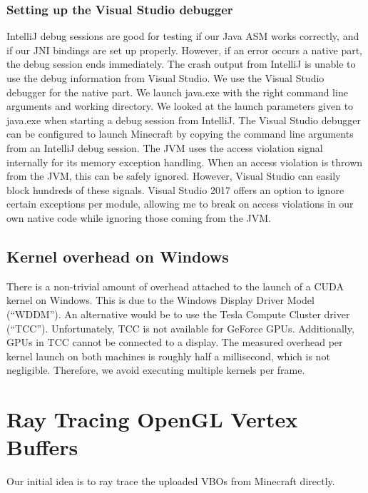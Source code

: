 \documentclass[]{article}
\begin{document}
\subsubsection{Setting up the Visual Studio debugger}
IntelliJ debug sessions are good for testing if our Java ASM works correctly, and if our JNI bindings are set up properly.
However, if an error occurs a native part, the debug session ends immediately.
The crash output from IntelliJ is unable to use the debug information from Visual Studio.
We use the Visual Studio debugger for the native part.
We launch java.exe with the right command line arguments and working directory.
We looked at the launch parameters given to java.exe when starting a debug session from IntelliJ.
The Visual Studio debugger can be configured to launch Minecraft by copying the command line arguments from an IntelliJ debug session.
The JVM uses the access violation signal internally for its memory exception handling.
When an access violation is thrown from the JVM, this can be safely ignored.
However, Visual Studio can easily block hundreds of these signals.
Visual Studio 2017 offers an option to ignore certain exceptions per module, allowing me to break on access violations in our own native code while ignoring those coming from the JVM.

\subsection{Kernel overhead on Windows}
There is a non-trivial amount of overhead attached to the launch of a CUDA kernel on Windows.
This is due to the Windows Display Driver Model (\enquote{WDDM}).
An alternative would be to use the Tesla Compute Cluster driver (\enquote{TCC}).
Unfortunately, TCC is not available for GeForce GPUs.
Additionally, GPUs in TCC cannot be connected to a display.
The measured overhead per kernel launch on both machines is roughly half a millisecond, which is not negligible.
Therefore, we avoid executing multiple kernels per frame.

\section{Ray Tracing OpenGL Vertex Buffers}
Our initial idea is to ray trace the uploaded VBOs from Minecraft directly.
\end{document}
